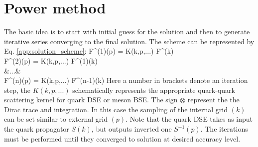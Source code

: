 \section*{Power method}
The basic idea is to start with initial guess for the solution and then to generate iterative series converging to the final solution. The scheme can be represented by Eq. \ref{app:solution_scheme}:
\beqa
\label{app:solution_scheme}
F^{(1)}(p) = K(k,p,...) \otimes F^{}(k) \\ 
F^{(2)}(p) = K(k,p,...) \otimes F^{(1)}(k) \\ 
\notag &...& \\
F^{(n)}(p) = K(k,p,...) \otimes F^{(n-1)}(k)
\eeqa
Here a number in brackets denote an iteration step, the $K(k,p,...)$ schematically represents the appropriate quark-quark scattering kernel for quark DSE or meson BSE. The sign $\otimes$ represent the the Dirac trace and integration. In this case the sampling of the internal grid $(k)$ can be set similar to external grid $(p)$. Note that the quark DSE takes as input the quark propagator $S(k)$, but outputs inverted one $S^{-1}(p)$. The iterations must be performed until they converged to solution at desired accuracy level.  \\ 

